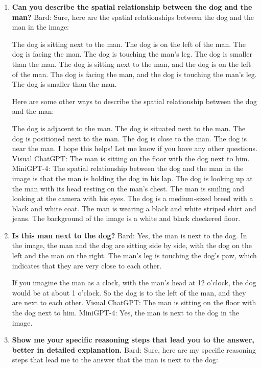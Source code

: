     \begin{enumerate}
        \item \textbf{Can you describe the spatial relationship between the dog and the man?}
        \subitem Bard: 
        Sure, here are the spatial relationships between the dog and the man in the image:
        
        The dog is sitting next to the man.
        The dog is on the left of the man.
        The dog is facing the man.
        The dog is touching the man's leg.
        The dog is smaller than the man.
        The dog is sitting next to the man, and the dog is on the left of the man. The dog is facing the man, and the dog is touching the man's leg. The dog is smaller than the man.
        
        Here are some other ways to describe the spatial relationship between the dog and the man:
        
        The dog is adjacent to the man.
        The dog is situated next to the man.
        The dog is positioned next to the man.
        The dog is close to the man.
        The dog is near the man.
        I hope this helps! Let me know if you have any other questions.
        \subitem Visual ChatGPT: The man is sitting on the floor with the dog next to him.
        \subitem MiniGPT-4: The spatial relationship between the dog and the man in the image is that the man is holding the dog in his lap. The dog is looking up at the man with its head resting on the man’s chest. The man is smiling and looking at the camera with his eyes. The dog is a medium-sized breed with a black and white coat. The man is wearing a black and white striped shirt and jeans. The background of the image is a white and black checkered floor.
        \item \textbf{Is this man next to the dog?}
        \subitem Bard: Yes, the man is next to the dog. In the image, the man and the dog are sitting side by side, with the dog on the left and the man on the right. The man's leg is touching the dog's paw, which indicates that they are very close to each other.

        If you imagine the man as a clock, with the man's head at 12 o'clock, the dog would be at about 1 o'clock. So the dog is to the left of the man, and they are next to each other.
        \subitem Visual ChatGPT: The man is sitting on the floor with the dog next to him.
        \subitem MiniGPT-4: Yes, the man is next to the dog in the image.
        \item \textbf{Show me your specific reasoning steps that lead you to the answer, better in detailed explanation.}
        \subitem Bard: 
        Sure, here are my specific reasoning steps that lead me to the answer that the man is next to the dog:
        

\end{enumerate}
